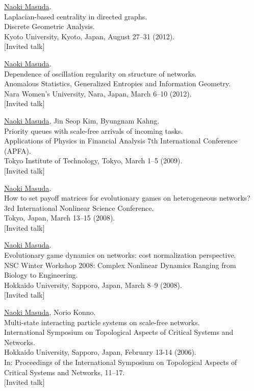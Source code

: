 \documentclass[11pt,letter]{article}
\begin{document}
\begin{etaremune}
\item \underline{Naoki Masuda}.\\
Laplacian-based centrality in directed graphs.\\
Discrete Geometric Analysis.\\
Kyoto University, Kyoto, Japan, August 27--31 (2012).\\
$[$Invited talk$]$

\item \underline{Naoki Masuda}.\\
Dependence of oscillation regularity on structure of networks.\\
Anomalous Statistics, Generalized Entropies and Information Geometry.\\
Nara Women's University, Nara, Japan, March 6--10 (2012).\\
$[$Invited talk$]$

\item \underline{Naoki Masuda}, Jin Seop Kim, Byungnam Kahng.\\
Priority queues with scale-free arrivals of incoming tasks.\\
Applications of Physics in Financial Analysis 7th International Conference (APFA).\\
Tokyo Institute of Technology, Tokyo, March 1--5 (2009).\\
$[$Invited talk$]$

\item \underline{Naoki Masuda}.\\
How to set payoff matrices for evolutionary games on heterogeneous networks?\\
3rd International Nonlinear Science Conference.\\
Tokyo, Japan, March 13--15 (2008).\\
$[$Invited talk$]$

\item \underline{Naoki Masuda}.\\
Evolutionary game dynamics on networks: cost normalization perspective.\\
NSC Winter Workshop 2008: Complex Nonlinear Dynamics Ranging from Biology to Engineering.\\
Hokkaido University, Sapporo, Japan, March 8--9 (2008).\\
$[$Invited talk$]$

\item \underline{Naoki Masuda}, Norio Konno.\\
Multi-state interacting particle systems on scale-free networks.\\
International Symposium on Topological Aspects of Critical Systems and Networks.\\
Hokkaido University, Sapporo, Japan, February 13-14 (2006).\\
In: Proceedings of the International Symposium on Topological Aspects of Critical Systems and Networks, 11--17.\\
$[$Invited talk$]$


\end{etaremune}
\end{document}
